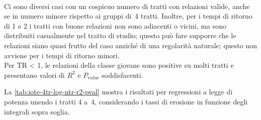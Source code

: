 %
\\
Ci sono diversi casi con un cospicuo numero di tratti con relazioni valide, anche se in numero minore rispetto ai gruppi di~4 tratti.
Inoltre, per i tempi di ritorno di \SI{1}{\anno} e \SI{2}{\anni} i tratti con buone relazioni non sono adiacenti o vicini, ma sono distribuiti casualmente nel tratto di studio; questo può fare supporre che le relazioni siano quasi frutto del caso anziché di una regolarità naturale; questo non avviene per i tempi di ritorno minori.
\\
Per TR \SI{< 1}{\anno}, le relazioni della classe giovane sono positive su molti tratti e presentano valori di $R^2$ e $P_\mathrm{value}$ soddisfacenti.


La \cref{tab:iote-4tr-log-ntr-r2-pval} mostra i risultati per regressioni a legge di potenza unendo i tratti 4 a~4, considerando i tassi di erosione in funzione degli integrali sopra soglia.
%
